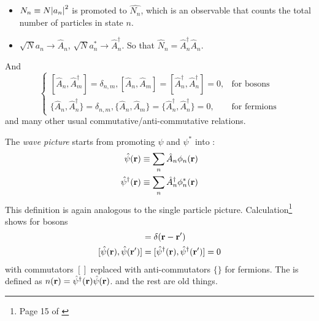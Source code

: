 \documentclass{article}
\begin{document}
\begin{itemize}
    \item $N_n\equiv N\abs{a_n}^2$ is promoted to $\hat{N_n}$, which is an
        observable that counts the total number of particles in state $n$.
    \item $\sqrt{N}a_n \rightarrow \hat{A}_n$,
        $\sqrt{N}a^*_n\rightarrow\hat{A}_n^\dagger$. So that
        $\hat{N}_n=\hat{A}_n^\dagger\hat{A}_n$.
\end{itemize}

And 
\begin{equation}
    \begin{cases}
        [\hat{A}_n,\hat{A}_m^\dagger] = \delta_{n,m},
        [\hat{A}_n,\hat{A}_m]=[\hat{A}_n^\dagger,\hat{A}_n^\dagger]=0,& \text{for bosons} \\
        \{\hat{A}_n,\hat{A}_n^\dagger\} = \delta_{n,m},
        \{\hat{A}_n,\hat{A}_m\}=\{\hat{A}_n^\dagger,\hat{A}_n^\dagger\}=0,& \text{for fermions}
    \end{cases}
\end{equation}
and many other usual commutative/anti-commutative relations.

The \textit{wave picture} starts from promoting $\psi$ and $\psi^*$ into
:
\begin{align}
    \hat{\psi}(\vb{r}) &\equiv \sum_n \hat{A}_n \phi_n (\vb{r}) \\
    \hat{\psi}^\dagger(\vb{r}) &\equiv \sum_n \hat{A}_n^\dagger \phi_n^* (\vb{r})
\end{align}
This definition is again analogous to the single particle picture.
Calculation\footnote{Page 15 of \cite{Nagaosa1999}} shows for bosons
\begin{align}
    [\hat{\psi}(\vb{r}),\hat{\psi}^\dagger(\vb{r}')] &= \delta(\vb{r}-\vb{r}') \\
    [\hat{\psi}(\vb{r}),\hat{\psi}(\vb{r}')] &=
        [\hat{\psi}^\dagger(\vb{r}),\hat{\psi}^\dagger(\vb{r}')] = 0
\end{align}
with commutators $[]$ replaced with anti-commutators $\{\}$ for fermions. The
 is defined as
$n(\vb{r})=\hat{\psi}^\dagger(\vb{r})\hat{\psi}(\vb{r})$. 
and the rest are old things.
\end{document}
